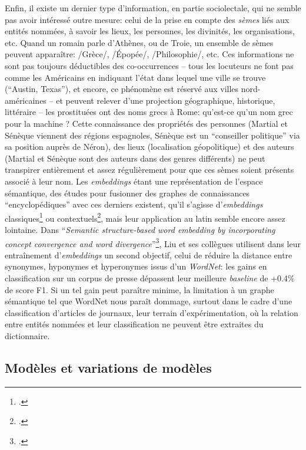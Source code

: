 Enfin, il existe un dernier type d'information, en partie sociolectale, qui ne semble pas avoir intéressé outre mesure: celui de la prise en compte des \textit{sèmes} liés aux entités nommées, à savoir les lieux, les personnes, les divinités, les organisations, etc. Quand un romain parle d'Athènes, ou de Troie, un ensemble de sèmes peuvent apparaître: /Grèce/, /Épopée/, /Philosophie/, etc. Ces informations ne sont pas toujours déductibles des co-occurrences -- tous les locuteurs ne font pas comme les Américains en indiquant l'état dans lequel une ville se trouve (\enquote{Austin, Texas}), et encore, ce phénomène est réservé aux villes nord-américaines -- et peuvent relever d'une projection géographique, historique, littéraire -- les prostituées ont des noms grecs à Rome: qu'est-ce qu'un nom grec pour la machine ? Cette connaissance des propriétés des personnes (Martial et Sénèque viennent des régions espagnoles, Sénèque est un \enquote{conseiller politique} via sa position auprès de Néron), des lieux (localisation géopolitique) et des auteurs (Martial et Sénèque sont des auteurs dans des genres différents) ne peut transpirer entièrement et assez régulièrement pour que ces sèmes soient présents associé à leur nom. Les \textit{embeddings} étant une représentation de l'espace sémantique, des études pour fusionner des graphes de connaissances \enquote{encyclopédiques} avec ces derniers existent, qu'il s'agisse d'\textit{embeddings} classiques\footcite{wang_knowledge_2014} ou contextuels\footcite{zhang_ernie_2019}, mais leur application au latin semble encore assez lointaine. Dans \enquote{\textit{Semantic structure-based word embedding by incorporating concept convergence and word divergence}}\footcite{liu_semantic_2018}, Liu et ses collègues utilisent dans leur entraînement d'\textit{embeddings} un second objectif, celui de réduire la distance entre synonymes, hyponymes et hyperonymes issus d'un \textit{WordNet}: les gains en classification sur un corpus de presse dépassent leur meilleure \textit{baseline} de +0.4\% de score F1. Si un tel gain peut paraître minime, la limitation à un graphe sémantique tel que WordNet nous paraît dommage, surtout dans le cadre d'une classification d'articles de journaux, leur terrain d'expérimentation, où la relation entre entités nommées et leur classification ne peuvent être extraites du dictionnaire.


\subsection{Modèles et variations de modèles}

